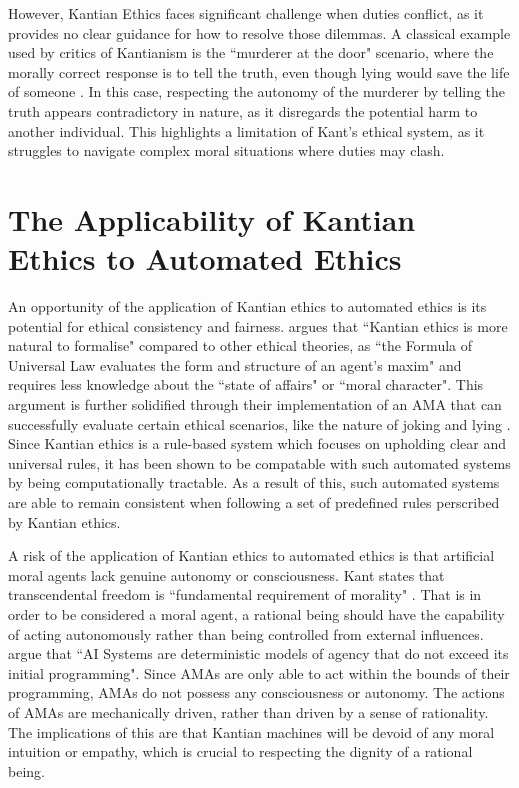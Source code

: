 \documentclass{article}
\begin{document}
However, Kantian Ethics faces significant challenge when duties conflict, as it provides
no clear guidance for how to resolve those dilemmas. A classical example used by
critics of Kantianism is the ``murderer at the door" scenario, where the morally correct response is
to tell the truth, even though lying would save the life of someone \parencite[p. 81]{bennet2015}. In this case,
respecting the autonomy of the murderer by telling the truth appears contradictory in nature, as it 
disregards the potential harm to another individual. This highlights a limitation of Kant's ethical system,
as it struggles to navigate complex moral situations where duties may clash.

\section{The Applicability of Kantian Ethics to Automated Ethics}

An opportunity of the application of Kantian ethics to automated ethics is its potential for ethical consistency and 
fairness. \textcite[p. 16]{singh2022} argues that ``Kantian ethics is more natural to formalise" compared
to other ethical theories, as ``the Formula of Universal Law evaluates the form and structure of an agent's
maxim" and requires less knowledge about the ``state of affairs" or ``moral character". This argument is 
further solidified through their implementation of an AMA that can successfully evaluate certain
ethical scenarios, like the nature of joking and lying \parencite[6--7]{singh2022}. Since Kantian
ethics is a rule-based system which focuses on upholding clear and universal rules, it has been shown to
be compatable with such automated systems by being computationally tractable. As a result of this, such 
automated systems are able to remain consistent when following a set of predefined rules perscribed by
Kantian ethics.

A risk of the application of Kantian ethics to automated ethics is that artificial moral agents lack
genuine autonomy or consciousness. Kant states that transcendental freedom is ``fundamental requirement of morality"
\parencite[p. 142]{mannananth2021}. That is in order to be considered a moral agent, a rational being should 
have the capability of acting autonomously rather than being controlled from external influences. \textcite[p. 149]{mannananth2021}
argue that ``AI Systems are deterministic models of agency that do not exceed its initial programming". Since AMAs are
only able to act within the bounds of their programming, AMAs do not possess any consciousness or autonomy. The actions
of AMAs are mechanically driven, rather than driven by a sense of rationality. The implications of this are that 
Kantian machines will be devoid of any moral intuition or empathy, which is crucial to respecting the dignity of
a rational being.
\end{document}
